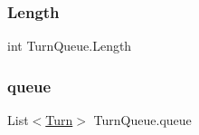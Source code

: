 \subsubsection{\texorpdfstring{Length}{Length}}
{\footnotesize\ttfamily int Turn\+Queue.\+Length\hspace{0.3cm}{\ttfamily [get]}}

\mbox{\label{class_turn_queue_a55c5122a7e3ce31ec8b79e9feb14bd27}} 
\subsubsection{\texorpdfstring{queue}{queue}}
{\footnotesize\ttfamily List$<$\mbox{\hyperlink{class_turn}{Turn}}$>$ Turn\+Queue.\+queue\hspace{0.3cm}{\ttfamily [get]}}

